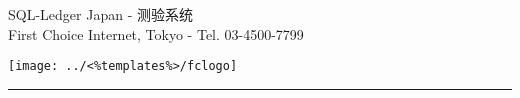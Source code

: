 \parbox[b]{\textwidth}{%
	\parbox[b]{0.80\textwidth}
	{\Large SQL-Ledger Japan - 	测验系统 \\
	 \normalsize First Choice Internet, Tokyo - Tel. 03-4500-7799 \\
	 }
 	\hfill
 	\parbox[b]{0.19\textwidth}{
 	\texttt{[image: ../<\%templates\%>/fclogo]}
 	}
 	\rule[1.5em]{\textwidth}{0.5pt}
}
